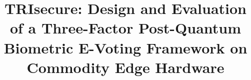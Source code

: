 \documentclass[a4paper,12pt]{article}
\begin{document}

\title{\textbf{TRIsecure: Design and Evaluation of a Three-Factor
  Post-Quantum Biometric E-Voting Framework on Commodity Edge Hardware}}
\author{}        %
\date{}
\maketitle
\thispagestyle{empty}
\end{document}
